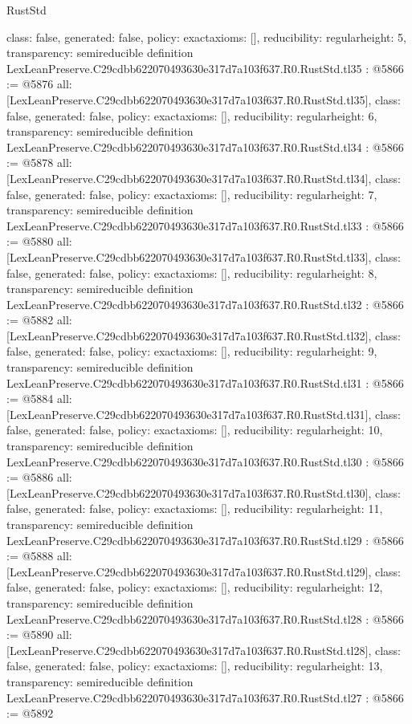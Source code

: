 \begin{lexlean}{RustStd}
\begin{coremodule}
{  class: false,
  generated: false,
  policy: exact{axioms: []},
  reducibility: regular{height: 5},
  transparency: semireducible
}
definition LexLeanPreserve.C29cdbb622070493630e317d7a103f637.R0.RustStd.tl35 : @5866 := @5876 {
  all: [LexLeanPreserve.C29cdbb622070493630e317d7a103f637.R0.RustStd.tl35],
  class: false,
  generated: false,
  policy: exact{axioms: []},
  reducibility: regular{height: 6},
  transparency: semireducible
}
definition LexLeanPreserve.C29cdbb622070493630e317d7a103f637.R0.RustStd.tl34 : @5866 := @5878 {
  all: [LexLeanPreserve.C29cdbb622070493630e317d7a103f637.R0.RustStd.tl34],
  class: false,
  generated: false,
  policy: exact{axioms: []},
  reducibility: regular{height: 7},
  transparency: semireducible
}
definition LexLeanPreserve.C29cdbb622070493630e317d7a103f637.R0.RustStd.tl33 : @5866 := @5880 {
  all: [LexLeanPreserve.C29cdbb622070493630e317d7a103f637.R0.RustStd.tl33],
  class: false,
  generated: false,
  policy: exact{axioms: []},
  reducibility: regular{height: 8},
  transparency: semireducible
}
definition LexLeanPreserve.C29cdbb622070493630e317d7a103f637.R0.RustStd.tl32 : @5866 := @5882 {
  all: [LexLeanPreserve.C29cdbb622070493630e317d7a103f637.R0.RustStd.tl32],
  class: false,
  generated: false,
  policy: exact{axioms: []},
  reducibility: regular{height: 9},
  transparency: semireducible
}
definition LexLeanPreserve.C29cdbb622070493630e317d7a103f637.R0.RustStd.tl31 : @5866 := @5884 {
  all: [LexLeanPreserve.C29cdbb622070493630e317d7a103f637.R0.RustStd.tl31],
  class: false,
  generated: false,
  policy: exact{axioms: []},
  reducibility: regular{height: 10},
  transparency: semireducible
}
definition LexLeanPreserve.C29cdbb622070493630e317d7a103f637.R0.RustStd.tl30 : @5866 := @5886 {
  all: [LexLeanPreserve.C29cdbb622070493630e317d7a103f637.R0.RustStd.tl30],
  class: false,
  generated: false,
  policy: exact{axioms: []},
  reducibility: regular{height: 11},
  transparency: semireducible
}
definition LexLeanPreserve.C29cdbb622070493630e317d7a103f637.R0.RustStd.tl29 : @5866 := @5888 {
  all: [LexLeanPreserve.C29cdbb622070493630e317d7a103f637.R0.RustStd.tl29],
  class: false,
  generated: false,
  policy: exact{axioms: []},
  reducibility: regular{height: 12},
  transparency: semireducible
}
definition LexLeanPreserve.C29cdbb622070493630e317d7a103f637.R0.RustStd.tl28 : @5866 := @5890 {
  all: [LexLeanPreserve.C29cdbb622070493630e317d7a103f637.R0.RustStd.tl28],
  class: false,
  generated: false,
  policy: exact{axioms: []},
  reducibility: regular{height: 13},
  transparency: semireducible
}
definition LexLeanPreserve.C29cdbb622070493630e317d7a103f637.R0.RustStd.tl27 : @5866 := @5892 {
}
\end{coremodule}
\end{lexlean}
